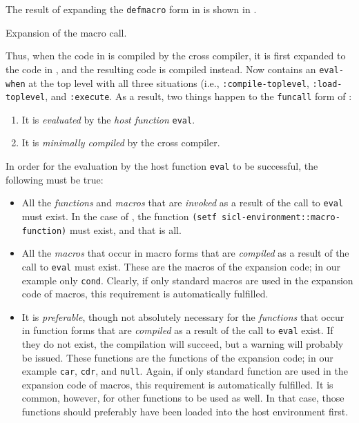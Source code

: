 The result of expanding the \texttt{defmacro} form in
 is shown in
. 

\begin{codefragment}
\caption{\label{code-macro-expansion-and}
Expansion of the macro call.}
\end{codefragment}

Thus, when the code in  is compiled by the
cross compiler, it is first expanded to the code in
, and the resulting code is compiled
instead.  Now  contains an
\texttt{eval-when} at the top level with all three situations (i.e.,
\texttt{:compile-toplevel}, \texttt{:load-toplevel}, and
\texttt{:execute}.  As a result, two things happen to the
\texttt{funcall} form of :

\begin{enumerate}
\item It is \emph{evaluated} by the \emph{host function}
  \texttt{eval}.
\item It is \emph{minimally compiled} by the cross compiler.
\end{enumerate}

In order for the evaluation by the host function \texttt{eval} to be
successful, the following must be true:

\begin{itemize}
\item All the \emph{functions} and \emph{macros} that are
  \emph{invoked} as a result of the call to \texttt{eval} must exist.
  In the case of , the function
  \texttt{(setf sicl-environment::macro-function)} must exist, and that
    is all.
\item All the \emph{macros} that occur in macro forms that are
  \emph{compiled} as a result of the call to \texttt{eval} must
  exist.  These are the macros of the expansion code; in our example
  only \texttt{cond}.  Clearly, if only standard \cl{} macros are
  used in the expansion code of macros, this requirement is
  automatically fulfilled.
\item It is \emph{preferable}, though not absolutely necessary for the
  \emph{functions} that occur in function forms that are
  \emph{compiled} as a result of the call to \texttt{eval} exist.  If
  they do not exist, the compilation will succeed, but a warning will
  probably be issued.  These functions are the functions of the
  expansion code; in our example \texttt{car}, \texttt{cdr}, and
  \texttt{null}.  Again, if only standard \cl{} function are used in
  the expansion code of macros, this requirement is automatically
  fulfilled.  It is common, however, for other functions to be used as
  well.  In that case, those functions should preferably have been
  loaded into the host environment first. 
\end{itemize}


